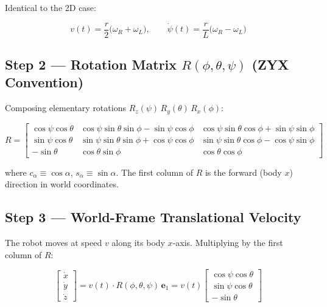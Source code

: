 \documentclass[12pt,a4paper]{article}
\newcommand{\cph}{\cos\phi}
\newcommand{\sph}{\sin\phi}
\newcommand{\cth}{\cos\theta}
\newcommand{\sth}{\sin\theta}
\newcommand{\cps}{\cos\psi}
\newcommand{\sps}{\sin\psi}
\newcommand{\eone}{\mathbf{e}_1}
\begin{document}
Identical to the 2D case:

\begin{equation}
  v(t) = \frac{r}{2}\bigl(\omega_R + \omega_L\bigr),
  \qquad
  \dot{\psi}(t) = \frac{r}{L}\bigl(\omega_R - \omega_L\bigr)
  \tag{11}
\end{equation}

\subsection{Step 2 — Rotation Matrix $R(\phi,\theta,\psi)$ (ZYX Convention)}

Composing elementary rotations $R_z(\psi)\,R_y(\theta)\,R_x(\phi)$:

\begin{equation}
  R =
  \begin{bmatrix}
    \cps\cth & \cps\sth\sph - \sps\cph & \cps\sth\cph + \sps\sph \\
    \sps\cth & \sps\sth\sph + \cps\cph & \sps\sth\cph - \cps\sph \\
    -\sth    & \cth\sph                & \cth\cph
  \end{bmatrix}
  \tag{12}
\end{equation}

where $c_\alpha \equiv \cos\alpha$, $s_\alpha \equiv \sin\alpha$.
The first column of $R$ is the forward (body $x$) direction in world
coordinates.

\subsection{Step 3 — World-Frame Translational Velocity}

The robot moves at speed $v$ along its body $x$-axis. Multiplying by the
first column of $R$:

\begin{equation}
  \begin{bmatrix}\dot x \\ \dot y \\ \dot z\end{bmatrix}
  = v(t)\cdot R(\phi,\theta,\psi)\,\eone
  = v(t)\begin{bmatrix}\cps\cth \\ \sps\cth \\ -\sth\end{bmatrix}
  \tag{13}
\end{equation}
\end{document}
